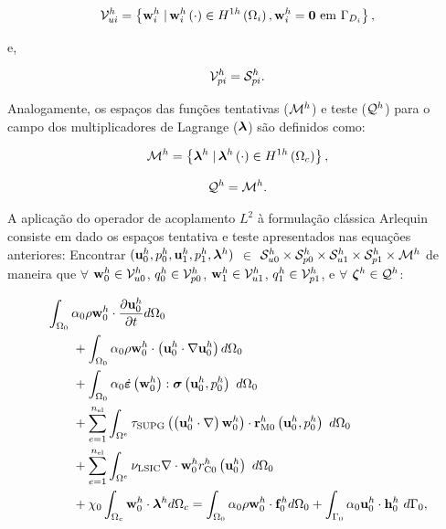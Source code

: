 \documentclass[tese_patricia]{subfiles}
\begin{document}
\begin{align}
	\mathcal{V}_{ui}^h = \left\{\mathbf{w}_{i}^{h} \left . \right| \mathbf{w}_{i}^{h} \left(\cdot\right) \in H^{1h}\left(\Omega_i\right), \mathbf{w}_{i}^{h} = \mathbf{0} \textrm { em} \ \Gamma_{D_i} \right\},
\end{align}

e,

\begin{align}
	\mathcal{V}_{pi}^h = \mathcal{S}_{pi}^h.
\end{align}

Analogamente, os espaços das funções tentativas ($\mathcal{M}^h$) e teste ($\mathcal{Q}^h$) para o campo dos multiplicadores de Lagrange ($\boldsymbol{\lambda}$) são definidos como:

\begin{align}
	\mathcal{M}^h = \left\{\boldsymbol{\lambda}^{h} \left . \right| \boldsymbol{\lambda}^{h} \left(\cdot\right) \in H^{1h}\left(\Omega_{c}\right) \right\},
\end{align}

\begin{align}
	\mathcal{Q}^h = \mathcal{M}^h.
\end{align}

A aplicação do operador de acoplamento $L^{2}$ à formulação clássica Arlequin consiste em dado os espaços tentativa e teste apresentados nas equações anteriores: Encontrar $(\mathbf{u}_0^h,p_0^h,\mathbf{u}_1^h,p_1^h,\boldsymbol{\lambda}^h)$ $\in$ $\mathcal{S}_{u0}^h \times \mathcal{S}_{p0}^h \times \mathcal{S}_{u1}^h \times \mathcal{S}_{p1}^h \times \mathcal{M}^h$ de maneira que  $\forall$ $\mathbf{w}_0^h \in \mathcal{V}_{u0}^h$, $q_0^h \in \mathcal{V}_{p0}^h$, $\mathbf{w}_1^h \in \mathcal{V}_{u1}^h$, $q_1^h \in \mathcal{V}_{p1}^h$,   e $\forall$ $\boldsymbol{\zeta}^h \in \mathcal{Q}^h$:

\begin{align}
	\begin{split}
		&\int_{\domain_0} \arlequinWFGlobal \density \wglobalh \cdot \frac{\partial\uglobalh}{\partial t} d\domain_{0} \\ 
		&\qquad+
		\int_{\domain_0} \arlequinWFGlobal \density \wglobalh \cdot  \left(\uglobalh \cdot \nabla\uglobalh\right) d\domain_{0}  \\ 
		&\qquad+	
		\int_{\domain_{0}} \arlequinWFGlobal \strainratetensor \left(\wglobalh\right) : \stresstensor \left(\uglobalh,\pglobalh\right)\ d\domain_{0} 
		 \\ 
		&\qquad+ \sum_{e=1}^{\nel} \int_{\domainE} \SUPG  \left(\left(\uglobalh \cdot \nabla \right) \wglobalh\right) \cdot \resMomGlobal\left(\uglobalh,\pglobalh \right)\  d\domain_{0} \\ 
		&\qquad+\sum_{e=1}^{\nel} \int_{\domainE} \LSIC \nabla \cdot \wglobalh \resPreGlobal 
		 \left(\uglobalh\right)\  d\domain_{0} \\
		 &\qquad+ \chi_{0} \int_{\domain_c} \wglobalh \cdot \lagrangeMultiplier^{h} d\domain_{c}  = \int_{\domain_0} \arlequinWFGlobal \density \wglobalh \cdot  \sbodyforce_{0}^{h} d\domain_{0} + \int_{\boundary_{0}} \arlequinWFGlobal \uglobalh \cdot \straction_{0}^{h}\ d\boundary_{0},
		\label{eq:FinalSystem0}
	\end{split}
\end{align}
\end{document}
